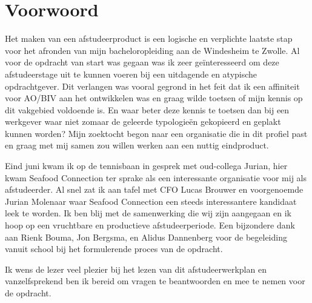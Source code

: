 \documentclass[10pt,a4paper,twoside]{report}
\begin{document}
\chapter*{Voorwoord}
\thispagestyle{empty}
\BgThispage
Het maken van een afstudeerproduct is een logische en verplichte laatste stap voor het afronden van mijn bacheloropleiding aan de Windesheim te Zwolle. Al voor de opdracht van start was gegaan was ik zeer geïnteresseerd om deze afstudeerstage uit te kunnen voeren bij een uitdagende en atypische opdrachtgever. Dit verlangen was vooral gegrond in het feit dat ik een affiniteit voor AO/BIV aan het ontwikkelen was en graag wilde toetsen of mijn kennis op dit vakgebied voldoende is. En waar beter deze kennis te toetsen dan bij een werkgever waar niet zomaar de geleerde typologieën gekopieerd en geplakt kunnen worden?
Mijn zoektocht begon naar een organisatie die in dit profiel past en graag met mij samen zou willen werken aan een nuttig eindproduct.

Eind juni kwam ik op de tennisbaan in gesprek met oud-collega Jurian, hier kwam Seafood Connection ter sprake als een interessante organisatie voor mij als afstudeerder. Al snel zat ik aan tafel met CFO Lucas Brouwer en voorgenoemde Jurian Molenaar waar Seafood Connection een steeds interessantere kandidaat leek te worden. Ik ben blij met de samenwerking die wij zijn aangegaan en ik hoop op een vruchtbare en productieve afstudeerperiode. Een bijzondere dank aan Rienk Bouma, Jon Bergsma, en Alidus Dannenberg voor de begeleiding vanuit school bij het formulerende proces van de opdracht. 

Ik wens de lezer veel plezier bij het lezen van dit afstudeerwerkplan en vanzelfsprekend ben ik bereid om vragen te beantwoorden en mee te nemen voor de opdracht.
\end{document}
